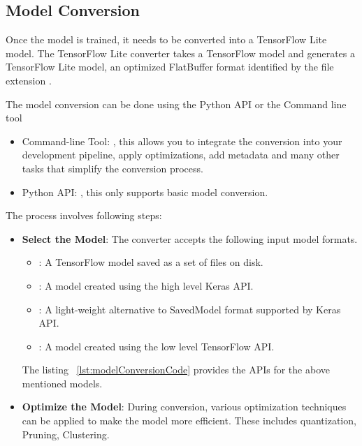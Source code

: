\subsection{Model Conversion}
\label{subsec:model_conversion}
Once the model is trained, it needs to be converted into a TensorFlow Lite model. The TensorFlow Lite converter takes a TensorFlow model and generates a TensorFlow Lite model, an optimized FlatBuffer format identified by the file extension . \cite{tensorflowModelConversion:2024}

The model conversion can be done using the Python API or the Command
line tool
\begin{itemize}
	\item Command-line Tool: , this allows you to integrate the conversion into your development pipeline, apply optimizations, add metadata and many other tasks that simplify the conversion process.
	\item Python API: , this only supports basic model conversion.
\end{itemize}

The process involves following steps:
\begin{itemize}
	\item \textbf{Select the Model}: The converter accepts the following input model formats.
	\begin{itemize}
		\item {}: A TensorFlow model saved as a set of files on disk.
		\item {}: A model created using the high level Keras API.
		\item {}: A light-weight alternative to SavedModel format supported by Keras API.
		\item {}: A model created using the low level TensorFlow API.
	\end{itemize}
	The listing ~\ref{lst:modelConversionCode} provides the APIs for the above mentioned models. \cite{tflConversionAPI:2024}
	
\begin{code}
	
\end{code}
	
	\item \textbf{Optimize the Model}: During conversion, various optimization techniques can be applied to make the model more efficient. These includes quantization, Pruning, Clustering.
\end{itemize}

